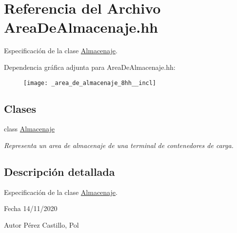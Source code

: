 \hypertarget{_area_de_almacenaje_8hh}{}\section{Referencia del Archivo Area\+De\+Almacenaje.\+hh}
\label{_area_de_almacenaje_8hh}


Especificación de la clase \hyperlink{class_almacenaje}{Almacenaje}.  


Dependencia gráfica adjunta para Area\+De\+Almacenaje.\+hh\+:
\nopagebreak
\begin{figure}[H]
\begin{center}
\leavevmode
\texttt{[image: \_area\_de\_almacenaje\_8hh\_\_incl]}
\end{center}
\end{figure}
\subsection*{Clases}
\begin{DoxyCompactItemize}
\item 
class \hyperlink{class_almacenaje}{Almacenaje}
\begin{DoxyCompactList}\small\item\em Representa un area de almacenaje de una terminal de contenedores de carga. \end{DoxyCompactList}\end{DoxyCompactItemize}


\subsection{Descripción detallada}
Especificación de la clase \hyperlink{class_almacenaje}{Almacenaje}. 

\begin{DoxyDate}{Fecha}
14/11/2020 
\end{DoxyDate}
\begin{DoxyAuthor}{Autor}
Pérez Castillo, Pol 
\end{DoxyAuthor}
